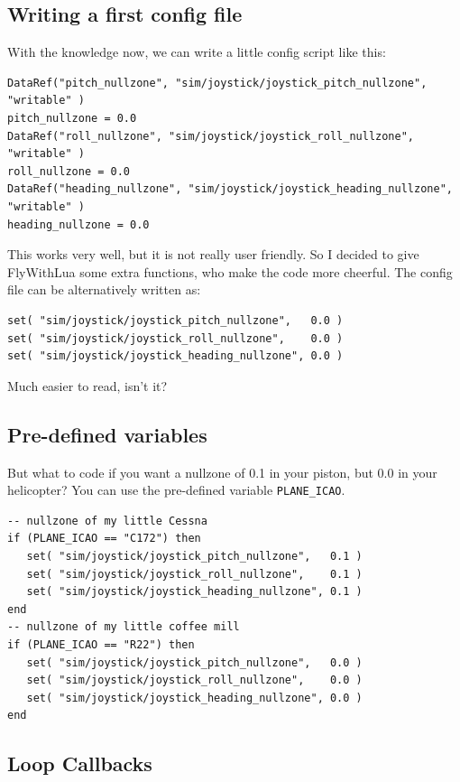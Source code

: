 \documentclass[11pt,parskip=half,a4paper]{scrartcl}
\begin{document}
\subsection{Writing a first config file}

With the knowledge now, we can write a little config script like this:

\begin{lstlisting}
DataRef("pitch_nullzone", "sim/joystick/joystick_pitch_nullzone", "writable" )
pitch_nullzone = 0.0
DataRef("roll_nullzone", "sim/joystick/joystick_roll_nullzone", "writable" )
roll_nullzone = 0.0
DataRef("heading_nullzone", "sim/joystick/joystick_heading_nullzone", "writable" )
heading_nullzone = 0.0
\end{lstlisting}

This works very well, but it is not really user friendly. So I decided to give FlyWithLua some extra functions, who make the code more cheerful. The config file can be alternatively written as:

\begin{lstlisting}
set( "sim/joystick/joystick_pitch_nullzone",   0.0 )
set( "sim/joystick/joystick_roll_nullzone",    0.0 )
set( "sim/joystick/joystick_heading_nullzone", 0.0 )
\end{lstlisting}

Much easier to read, isn't it?

\subsection{Pre-defined variables}

But what to code if you want a nullzone of 0.1 in your piston, but 0.0 in your helicopter? You can use the pre-defined variable \verb|PLANE_ICAO|.

\begin{lstlisting}
-- nullzone of my little Cessna
if (PLANE_ICAO == "C172") then
   set( "sim/joystick/joystick_pitch_nullzone",   0.1 )
   set( "sim/joystick/joystick_roll_nullzone",    0.1 )
   set( "sim/joystick/joystick_heading_nullzone", 0.1 )
end
-- nullzone of my little coffee mill
if (PLANE_ICAO == "R22") then
   set( "sim/joystick/joystick_pitch_nullzone",   0.0 )
   set( "sim/joystick/joystick_roll_nullzone",    0.0 )
   set( "sim/joystick/joystick_heading_nullzone", 0.0 )
end
\end{lstlisting}

\subsection{Loop Callbacks}
\end{document}
